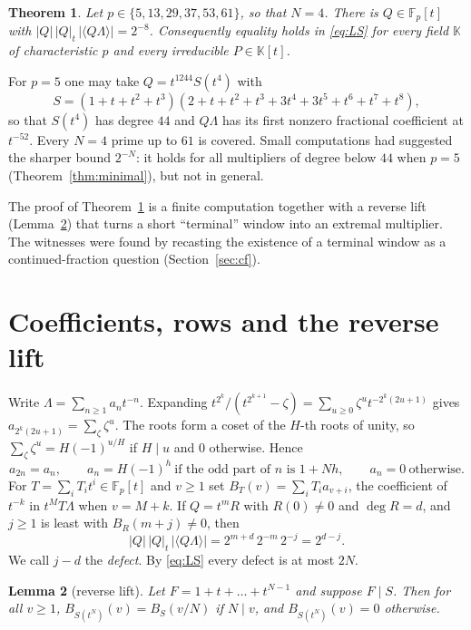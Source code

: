 \documentclass[11pt]{amsart}
\newtheorem{theorem}{Theorem}
\newtheorem{lemma}[theorem]{Lemma}
\theoremstyle{definition}
\theoremstyle{remark}
\newcommand{\F}{\mathbb{F}}
\newcommand{\K}{\mathbb{K}}
\newcommand{\abs}[1]{\left|#1\right|}
\newcommand{\frp}[1]{\langle #1\rangle}
\begin{document}
\begin{theorem}\label{thm:main}
Let $p\in\{5,13,29,37,53,61\}$, so that $N=4$. There is $Q\in\F_p[t]$ with
$\abs{Q}\,\abs{Q}_t\,\abs{\frp{Q\Lambda}}=2^{-8}$. Consequently equality holds
in \eqref{eq:LS} for every field $\K$ of characteristic $p$ and every
irreducible $P\in\K[t]$.
\end{theorem}

For $p=5$ one may take $Q=t^{1244}S(t^4)$ with
\[
S=(1+t+t^2+t^3)(2+t+t^2+t^3+3t^4+3t^5+t^6+t^7+t^8),
\]
so that $S(t^4)$ has degree $44$ and $Q\Lambda$ has its first nonzero
fractional coefficient at $t^{-52}$. Every $N=4$ prime up to $61$ is covered.
Small computations had suggested the sharper bound $2^{-N}$: it holds for all
multipliers of degree below $44$ when $p=5$ (Theorem~\ref{thm:minimal}), but
not in general.

The proof of Theorem~\ref{thm:main} is a finite computation together with a
reverse lift (Lemma~\ref{lem:lift}) that turns a short ``terminal'' window into
an extremal multiplier. The witnesses were found by recasting the existence of
a terminal window as a continued-fraction question (Section~\ref{sec:cf}).

\section{Coefficients, rows and the reverse lift}

Write $\Lambda=\sum_{n\ge1}a_nt^{-n}$. Expanding
$t^{2^k}/(t^{2^{k+1}}-\zeta)=\sum_{u\ge0}\zeta^u t^{-2^k(2u+1)}$ gives
$a_{2^k(2u+1)}=\sum_\zeta\zeta^u$. The roots form a coset of the $H$-th roots of
unity, so $\sum_\zeta\zeta^u=H(-1)^{u/H}$ if $H\mid u$ and $0$ otherwise. Hence
\begin{equation}\label{eq:coeff}
a_{2n}=a_n,\qquad a_n=H(-1)^h\ \text{if the odd part of $n$ is $1+Nh$},
\qquad a_n=0\ \text{otherwise}.
\end{equation}
For $T=\sum_iT_it^i\in\F_p[t]$ and $v\ge1$ set $B_T(v)=\sum_iT_ia_{v+i}$, the
coefficient of $t^{-k}$ in $t^MT\Lambda$ when $v=M+k$. If $Q=t^mR$ with
$R(0)\neq0$ and $\deg R=d$, and $j\ge1$ is least with $B_R(m+j)\neq0$, then
\begin{equation}\label{eq:product}
\abs{Q}\,\abs{Q}_t\,\abs{\frp{Q\Lambda}}=2^{m+d}\,2^{-m}\,2^{-j}=2^{d-j}.
\end{equation}
We call $j-d$ the \emph{defect}. By \eqref{eq:LS} every defect is at most
$2N$.

\begin{lemma}[reverse lift]\label{lem:lift}
Let $F=1+t+\dots+t^{N-1}$ and suppose $F\mid S$. Then for all $v\ge1$,
$B_{S(t^N)}(v)=B_S(v/N)$ if $N\mid v$, and $B_{S(t^N)}(v)=0$ otherwise.
\end{lemma}
\end{document}
